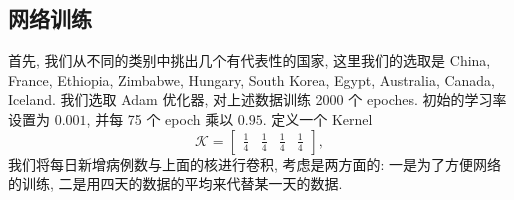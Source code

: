 \documentclass[UTF8]{ctexart}
\begin{document}
    \subsection*{网络训练}
    首先, 我们从不同的类别中挑出几个有代表性的国家, 这里我们的选取是 China, France, Ethiopia, Zimbabwe, Hungary, South Korea, Egypt, Australia, Canada, Iceland. 我们选取 Adam 优化器, 对上述数据训练 2000 个 epoches. 初始的学习率设置为 $0.001$, 并每 75 个 epoch 乘以 $0.95$. 定义一个 Kernel
	\[
	\mathcal{K} =
	\begin{bmatrix}
		\displaystyle\frac{1}{4}&\displaystyle\frac{1}{4}&\displaystyle\frac{1}{4}&\displaystyle\frac{1}{4}
	\end{bmatrix},
	\]
	我们将每日新增病例数与上面的核进行卷积, 考虑是两方面的: 一是为了方便网络的训练, 二是用四天的数据的平均来代替某一天的数据.
	\begin{figure}[htbp]
	    \centering
	\end{figure}
\end{document}
